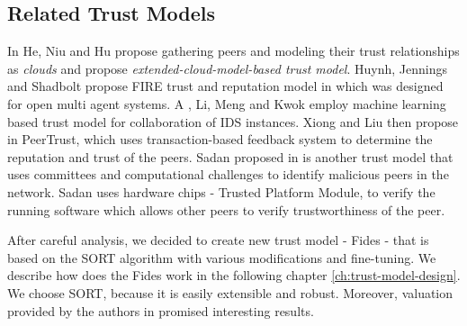 \subsection{Related Trust Models}
\label{subsec:related-trust-models}
In \cite{1562680} He, Niu and Hu propose gathering peers and modeling their trust relationships as \textit{clouds} and propose \textit{extended-cloud-model-based trust model}.
Huynh, Jennings and Shadbolt propose FIRE trust and reputation model in \cite{huynh2006integrated} which was designed for open multi agent systems.
A \cite{li2014design}, Li, Meng and Kwok employ machine learning based trust model for collaboration of IDS instances.
Xiong and Liu then propose in \cite{xiong2004peertrust} PeerTrust, which uses transaction-based feedback system to determine the reputation and trust of the peers.
Sadan proposed in \cite{abera2019sadan} is another trust model that uses committees and computational challenges to identify malicious peers in the network.
Sadan uses hardware chips - Trusted Platform Module, to verify the running software which allows other peers to verify trustworthiness of the peer.

\vspace{1cm}

\noindent
After careful analysis, we decided to create new trust model - Fides - that is based on the SORT algorithm with various modifications and fine-tuning.
We describe how does the Fides work in the following chapter \ref{ch:trust-model-design}.
We choose SORT, because it is easily extensible and robust. 
Moreover, valuation provided by the authors in \cite{sort} promised interesting results.